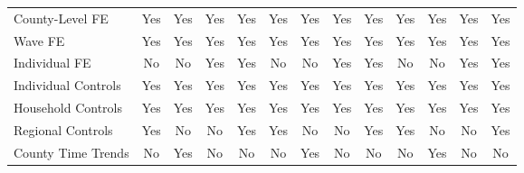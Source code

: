 \begin{tabular}{l*{1}cccccccccccc}
County-Level FE&         Yes         &         Yes         &         Yes         &         Yes         &       Yes         &         Yes         &         Yes         &         Yes         &         Yes         &         Yes         &         Yes       
 &         Yes         \\
Wave FE     &         Yes         &         Yes         &         Yes         &         Yes         &         Yes         &         Yes         &         Yes         &         Yes         &         Yes         &         Yes         &         Yes         &
        Yes         \\
Individual FE&          No         &          No         &         Yes         &         Yes         &         No         &          No         &         Yes         &         Yes         &          No         &          No         &         Yes         
&         Yes         \\
Individual Controls&         Yes         &         Yes         &         Yes         &         Yes         &   Yes         &         Yes         &         Yes         &         Yes         &         Yes         &         Yes         &         Yes   
     &         Yes         \\
Household Controls&         Yes         &         Yes         &         Yes         &         Yes         &    Yes         &         Yes         &         Yes         &         Yes         &         Yes         &         Yes         &         Yes    
    &         Yes         \\
Regional Controls&         Yes         &          No         &          No         &         Yes         &     Yes         &          No         &          No         &         Yes         &         Yes         &          No         &          No     
   &         Yes         \\
County Time Trends&          No         &         Yes         &          No         &          No         &    No         &         Yes         &          No         &          No         &          No         &         Yes         &          No    
    &          No         \\
\bottomrule
\end{tabular}